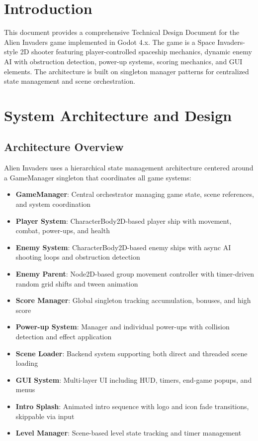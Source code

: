 \documentclass{article}
\begin{document}
\newpage

\tableofcontents

\newpage

\section{Introduction}
This document provides a comprehensive Technical Design Document for the Alien Invaders game implemented in Godot 4.x. The game is a Space Invaders-style 2D shooter featuring player-controlled spaceship mechanics, dynamic enemy AI with obstruction detection, power-up systems, scoring mechanics, and GUI elements. The architecture is built on singleton manager patterns for centralized state management and scene orchestration.

\section{System Architecture and Design}

\subsection{Architecture Overview}

Alien Invaders uses a hierarchical state management architecture centered around a GameManager singleton that coordinates all game systems:

\begin{itemize}
    \item \textbf{GameManager}: Central orchestrator managing game state, scene references, and system coordination
    \item \textbf{Player System}: CharacterBody2D-based player ship with movement, combat, power-ups, and health
    \item \textbf{Enemy System}: CharacterBody2D-based enemy ships with async AI shooting loops and obstruction detection
    \item \textbf{Enemy Parent}: Node2D-based group movement controller with timer-driven random grid shifts and tween animation
    \item \textbf{Score Manager}: Global singleton tracking accumulation, bonuses, and high score
    \item \textbf{Power-up System}: Manager and individual power-ups with collision detection and effect application
    \item \textbf{Scene Loader}: Backend system supporting both direct and threaded scene loading
    \item \textbf{GUI System}: Multi-layer UI including HUD, timers, end-game popups, and menus
    \item \textbf{Intro Splash}: Animated intro sequence with logo and icon fade transitions, skippable via input
    \item \textbf{Level Manager}: Scene-based level state tracking and timer management
\end{itemize}
\end{document}
